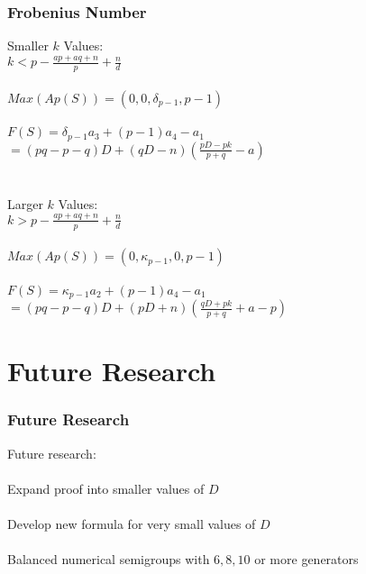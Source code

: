 \documentclass{beamer}
\begin{document}
\begin{frame}
\begin{center}
\frametitle{Frobenius Number}
{\footnotesize
Smaller $k$ Values:\\

$k < p - \frac{a p + a q + n}{p} + \frac{n}{d}$\\

~\\

$Max(Ap(S)) = \left(0, 0, \delta _ {p - 1}, p - 1\right)$\\

~\\

$F(S) = \delta _ {p - 1} a_3 + \left( p - 1 \right) a_4 - a_1$\\
$ = \left( p q - p - q \right) D + \left( q D - n \right) \left( \frac{p D - p k}{p + q} - a \right)$\\

~\\

~\\

Larger $k$ Values:\\

$k > p - \frac{a p + a q + n}{p} + \frac{n}{d}$\\

~\\

$Max(Ap(S)) = \left(0, \kappa _ {p - 1}, 0, p - 1\right)$\\

~\\

$F(S) = \kappa _ {p - 1} a_2 + \left( p - 1 \right) a_4 - a_1$\\
$ = \left( p q - p - q \right) D + \left( p D + n \right) \left( \frac{q D + p k}{p + q} + a - p \right)$}

\end{center}
\end{frame}

\section{Future Research}

\begin{frame}
\begin{center}
\frametitle{Future Research}

Future research:\\~\\
Expand proof into smaller values of $D$\\~\\
Develop new formula for very small values of $D$\\~\\
Balanced numerical semigroups with $6, 8, 10$ or more generators\\

\end{center}
\end{frame}
\end{document}
